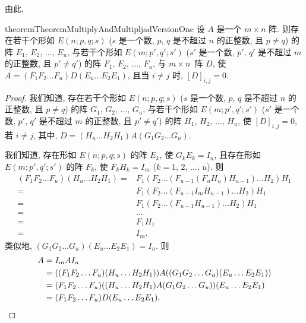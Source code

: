 \documentclass[../libro.tex]{subfiles}
\begin{document}
由此,

\begin{restatable}{theorem}{TheoremMultiplyAndMultipljadVersionOne}
    设 \(A\) 是一个 \(m \times n\) 阵.
    则存在若干个形如 \(E(n; p, q; s)\)
    (\(s\) 是一个数, %
    \(p\), \(q\) 是不超过 \(n\) 的正整数,
    且 \(p \neq q\)) %
    的阵
    \(E_1\), \(E_2\), \(\dots\), \(E_u\),
    与若干个形如 \(E(m; p', q'; s')\)
    (\(s'\) 是一个数, %
    \(p'\), \(q'\) 是不超过 \(m\) 的正整数,
    且 \(p' \neq q'\)) %
    的阵
    \(F_1\), \(F_2\), \(\dots\), \(F_u\),
    与 \(m \times n\)~阵 \(D\),
    使
    \(A = (F_1 F_2 \dots F_u) D (E_u \dots E_2 E_1)\),
    且当 \(i \neq j\) 时, \([D]_{i,j} = 0\).
\end{restatable}

\begin{proof}
    我们知道,
    存在若干个形如 \(E(n; p, q; s)\)
    (\(s\) 是一个数,
    \(p\), \(q\) 是不超过 \(n\) 的正整数, %
    且 \(p \neq q\))
    的阵
    \(G_1\), \(G_2\), \(\dots\), \(G_u\),
    与若干个形如 \(E(m; p', q'; s')\)
    (\(s'\) 是一个数,
    \(p'\), \(q'\) 是不超过 \(m\) 的正整数, %
    且 \(p' \neq q'\))
    的阵
    \(H_1\), \(H_2\), \(\dots\), \(H_u\),
    使
    \([D]_{i,j} = 0\),
    若 \(i \neq j\),
    其中,
    \(D = (H_u \dots H_2 H_1) A (G_1 G_2 \dots G_u)\).

    我们知道,
    存在形如 \(E(n; p, q; s)\) 的阵 \(E_k\), 使
    \(G_k E_k = I_n\),
    且存在形如 \(E(m; p', q'; s')\) 的阵 \(F_k\), 使
    \(F_k H_k = I_m\)
    (\(k = 1\), \(2\), \(\dots\), \(u\)).
    则
    \begin{align*}
        (F_1 F_2 \dots F_u) (H_u \dots H_2 H_1)
        = {} &
        F_1 (F_2 \dots (F_{u-1} (F_u H_u) H_{u-1}) \dots H_2) H_1
        \\
        = {} &
        F_1 (F_2 \dots (F_{u-1} I_m H_{u-1}) \dots H_2) H_1
        \\
        = {} &
        F_1 (F_2 \dots (F_{u-1} H_{u-1}) \dots H_2) H_1
        \\
        = {} &
        \dots
        \\
        = {} &
        F_1 H_1
        \\
        = {} &
        I_m.
    \end{align*}
    类似地,
    \((G_1 G_2 \dots G_u) (E_u \dots E_2 E_1) = I_n\).
    则
    \begin{align*}
        A
        = {} &
        I_m A I_n
        \\
        = {} &
        ((F_1 F_2 \dots F_u) (H_u \dots H_2 H_1))
        A
        ((G_1 G_2 \dots G_u) (E_u \dots E_2 E_1))
        \\
        = {} &
        (F_1 F_2 \dots F_u)
        ((H_u \dots H_2 H_1) A (G_1 G_2 \dots G_u))
        (E_u \dots E_2 E_1)
        \\
        = {} &
        (F_1 F_2 \dots F_u) D (E_u \dots E_2 E_1).
        \qedhere
    \end{align*}
\end{proof}
\end{document}
